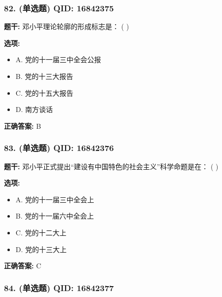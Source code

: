 \documentclass[12pt,UTF8]{ctexart}
\begin{document}
\subsubsection*{82. (单选题) \small QID: 16842375}

\textbf{题干:}
邓小平理论轮廓的形成标志是： ( )

\textbf{选项:}
\begin{itemize}[leftmargin=*]

  \item A. 党的十一届三中全会公报

  \item B. 党的十三大报告

  \item C. 党的十五大报告

  \item D. 南方谈话

\end{itemize}

\textbf{正确答案:}
B

\vspace{0.3em}\hrulefill\vspace{0.7em}

\subsubsection*{83. (单选题) \small QID: 16842376}

\textbf{题干:}
邓小平正式提出“建设有中国特色的社会主义”科学命题是在： ( )

\textbf{选项:}
\begin{itemize}[leftmargin=*]

  \item A. 党的十一届三中全会上

  \item B. 党的十一届六中全会上

  \item C. 党的十二大上

  \item D. 党的十三大上

\end{itemize}

\textbf{正确答案:}
C

\vspace{0.3em}\hrulefill\vspace{0.7em}

\subsubsection*{84. (单选题) \small QID: 16842377}
\end{document}
